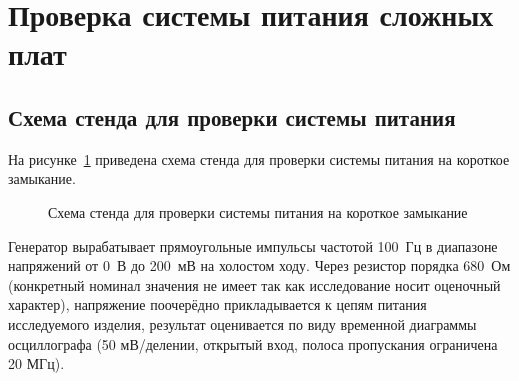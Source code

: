 \section{Проверка системы питания  сложных плат} \label{power_check}

\subsection{Схема стенда для проверки системы питания} \label{spar:stend}

На рисунке~\ref{p:report_powe_stend} приведена схема стенда для проверки системы питания на короткое замыкание.

\begin{figure}[H]
  \captionsetup{singlelinecheck=true} %
  \caption{Схема стенда для проверки системы питания на короткое замыкание} \label{p:report_powe_stend}
\end{figure}

Генератор вырабатывает прямоугольные импульсы частотой 100~Гц в диапазоне напряжений от 0~В до 200~мВ на холостом ходу. Через резистор порядка 680~Ом (конкретный номинал значения не имеет так как исследование носит оценочный характер), напряжение поочерёдно прикладывается к цепям питания исследуемого изделия, результат оценивается по виду временной диаграммы осциллографа (50 мВ/делении, открытый вход, полоса пропускания ограничена 20 МГц).

